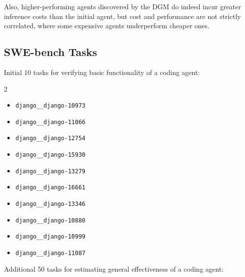 \documentclass{article} %
\begin{document}
Also, higher-performing agents discovered by the DGM do indeed incur greater inference costs than the initial agent, but cost and performance are not strictly correlated, where some expensive agents underperform cheaper ones.

\subsection{SWE-bench Tasks}
\label{app:swebench-tasks}

Initial 10 tasks for verifying basic functionality of a coding agent:

\begin{multicols}{2}
\begin{itemize}
    \item \texttt{django\_\_django-10973}
    \item \texttt{django\_\_django-11066}
    \item \texttt{django\_\_django-12754}
    \item \texttt{django\_\_django-15930}
    \item \texttt{django\_\_django-13279}
    \item \texttt{django\_\_django-16661}
    \item \texttt{django\_\_django-13346}
    \item \texttt{django\_\_django-10880}
    \item \texttt{django\_\_django-10999}
    \item \texttt{django\_\_django-11087}
\end{itemize}
\end{multicols}


Additional 50 tasks for estimating general effectiveness of a coding agent:
\end{document}
